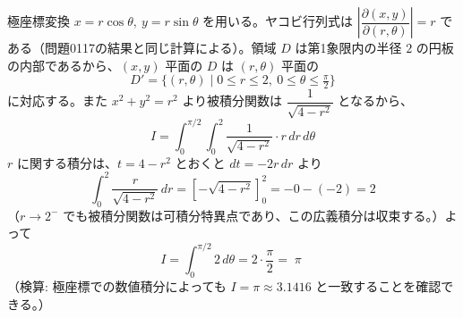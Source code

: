 
極座標変換 $x = r\cos\theta,\ y = r\sin\theta$ を用いる。ヤコビ行列式は $\left|\dfrac{\partial(x,y)}{\partial(r,\theta)}\right| = r$ である（問題0117の結果と同じ計算による）。領域 $D$ は第1象限内の半径 $2$ の円板の内部であるから、$(x,y)$ 平面の $D$ は $(r,\theta)$ 平面の
\[
D' = \{(r,\theta) \mid 0 \le r \le 2,\ 0 \le \theta \le \tfrac{\pi}{2}\}
\]
に対応する。また $x^{2}+y^{2} = r^{2}$ より被積分関数は $\dfrac{1}{\sqrt{4-r^{2}}}$ となるから、
\[
I = \int_{0}^{\pi/2} \int_{0}^{2} \frac{1}{\sqrt{4-r^{2}}} \cdot r\, dr\, d\theta
\]
$r$ に関する積分は、$t = 4 - r^{2}$ とおくと $dt = -2r\, dr$ より
\[
\int_{0}^{2} \frac{r}{\sqrt{4-r^{2}}}\, dr
= \left[ -\sqrt{4-r^{2}} \right]_{0}^{2}
= -0 - (-2) = 2
\]
（$r \to 2^{-}$ でも被積分関数は可積分特異点であり、この広義積分は収束する。）よって
\[
I = \int_{0}^{\pi/2} 2\, d\theta = 2 \cdot \frac{\pi}{2} = \boxed{\; \pi \;}
\]
（検算: 極座標での数値積分によっても $I = \pi \approx 3.1416$ と一致することを確認できる。）
